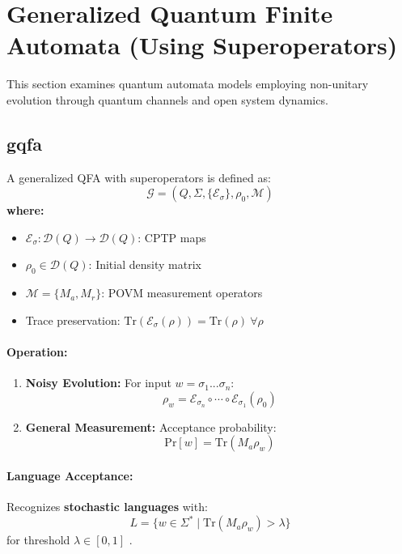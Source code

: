 \section{Generalized Quantum Finite Automata (Using Superoperators)}
\label{sec:gqfa}

This section examines quantum automata models employing non-unitary evolution through quantum channels and open system dynamics.

\subsection{\acrfull{gqfa}}
\label{subsec:gqfa}

\begin{definition}
A generalized QFA with superoperators is defined as:
\[
\mathcal{G} = (Q, \Sigma, \{\mathcal{E}_\sigma\}, \rho_0, \mathcal{M})
\]
\textbf{where:}
\begin{itemize}
    \item $\mathcal{E}_\sigma: \mathcal{D}(Q) \rightarrow \mathcal{D}(Q)$: CPTP maps
    \item $\rho_0 \in \mathcal{D}(Q)$: Initial density matrix
    \item $\mathcal{M} = \{M_a, M_r\}$: POVM measurement operators
    \item Trace preservation: $\text{Tr}(\mathcal{E}_\sigma(\rho)) = \text{Tr}(\rho)\ \forall\rho$
\end{itemize}
\end{definition}

\paragraph{Operation:}
\begin{enumerate}
    \item \textbf{Noisy Evolution:} For input $w = \sigma_1...\sigma_n$:
    \[
    \rho_w = \mathcal{E}_{\sigma_n} \circ \cdots \circ \mathcal{E}_{\sigma_1} (\rho_0)
    \]
    \item \textbf{General Measurement:} Acceptance probability:
    \[
    \text{Pr}[w] = \text{Tr}(M_a \rho_w)
    \]
\end{enumerate}

\paragraph{Language Acceptance:}
Recognizes \textbf{stochastic languages} with:
\[
L = \{w \in \Sigma^* \mid \text{Tr}(M_a \rho_w) > \lambda\}
\]
for threshold $\lambda \in [0,1]$ \cite{hirvensalo2012quantum}.

